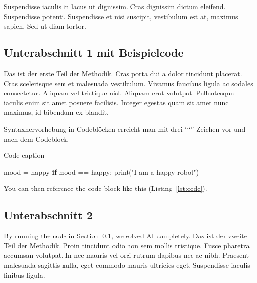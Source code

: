 \documentclass[listof=totoc,index=totoc,bibliography=totoc,12pt,ngerman,a4paper,]{report}
\newenvironment{Shaded}{}{}
\newcommand{\BuiltInTok}[1]{\textcolor[rgb]{0.00,0.50,0.00}{#1}}
\newcommand{\ControlFlowTok}[1]{\textcolor[rgb]{0.00,0.44,0.13}{\textbf{#1}}}
\newcommand{\NormalTok}[1]{#1}
\newcommand{\OperatorTok}[1]{\textcolor[rgb]{0.40,0.40,0.40}{#1}}
\newcommand{\StringTok}[1]{\textcolor[rgb]{0.25,0.44,0.63}{#1}}
\begin{document}
Suspendisse iaculis in lacus ut dignissim. Cras dignissim dictum
eleifend. Suspendisse potenti. Suspendisse et nisi suscipit, vestibulum
est at, maximus sapien. Sed ut diam tortor.

\subsection{Unterabschnitt 1 mit Beispielcode}\label{sec:subsec-code}

Das ist der erste Teil der Methodik. Cras porta dui a dolor tincidunt
placerat. Cras scelerisque sem et malesuada vestibulum. Vivamus faucibus
ligula ac sodales consectetur. Aliquam vel tristique nisl. Aliquam erat
volutpat. Pellentesque iaculis enim sit amet posuere facilisis. Integer
egestas quam sit amet nunc maximus, id bibendum ex blandit.

Syntaxhervorhebung in Codeblöcken erreicht man mit drei ```'' Zeichen
vor und nach dem Codeblock.

\begin{codelisting}

\caption{Code caption}

\hypertarget{lst:code}{%
\label{lst:code}}%
\begin{Shaded}
\begin{Highlighting}[]
\NormalTok{mood }\OperatorTok{=} \StringTok{\textquotesingle{}happy\textquotesingle{}}
\ControlFlowTok{if}\NormalTok{ mood }\OperatorTok{==} \StringTok{\textquotesingle{}happy\textquotesingle{}}\NormalTok{:}
    \BuiltInTok{print}\NormalTok{(}\StringTok{"I am a happy robot"}\NormalTok{)}
\end{Highlighting}
\end{Shaded}

\end{codelisting}

You can then reference the code block like this
(Listing~\ref{lst:code}).

\subsection{Unterabschnitt 2}\label{unterabschnitt-2}

By running the code in Section~\ref{sec:subsec-code}, we solved AI
completely. Das ist der zweite Teil der Methodik. Proin tincidunt odio
non sem mollis tristique. Fusce pharetra accumsan volutpat. In nec
mauris vel orci rutrum dapibus nec ac nibh. Praesent malesuada sagittis
nulla, eget commodo mauris ultricies eget. Suspendisse iaculis finibus
ligula.
\end{document}
